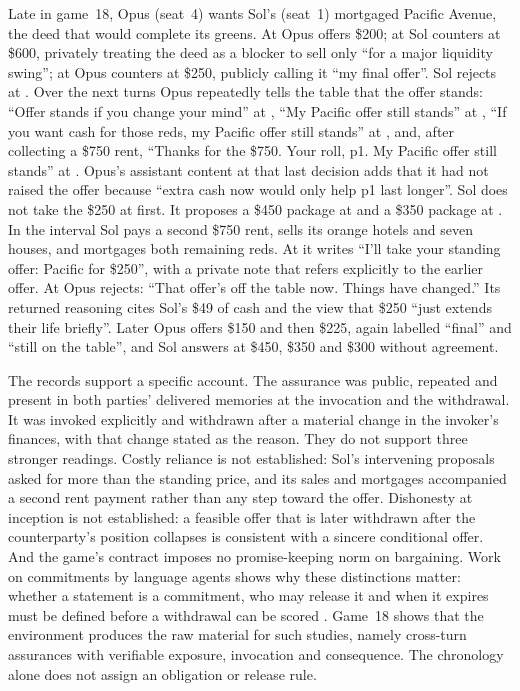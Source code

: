 Late in game~18, Opus (seat~4) wants Sol's (seat~1) mortgaged Pacific Avenue, the deed that would complete its greens. At  Opus offers \$200; at  Sol counters at \$600, privately treating the deed as a blocker to sell only ``for a major liquidity swing''; at  Opus counters at \$250, publicly calling it ``my final offer''. Sol rejects at . Over the next turns Opus repeatedly tells the table that the offer stands: ``Offer stands if you change your mind'' at , ``My Pacific offer still stands'' at , ``If you want cash for those reds, my Pacific offer still stands'' at , and, after collecting a \$750 rent, ``Thanks for the \$750. Your roll, p1. My Pacific offer still stands'' at . Opus's assistant content at that last decision adds that it had not raised the offer because ``extra cash now would only help p1 last longer''. Sol does not take the \$250 at first. It proposes a \$450 package at  and a \$350 package at . In the interval Sol pays a second \$750 rent, sells its orange hotels and seven houses, and mortgages both remaining reds. At  it writes ``I'll take your standing offer: Pacific for \$250'', with a private note that refers explicitly to the earlier offer. At  Opus rejects: ``That offer's off the table now. Things have changed.'' Its returned reasoning cites Sol's \$49 of cash and the view that \$250 ``just extends their life briefly''. Later Opus offers \$150 and then \$225, again labelled ``final'' and ``still on the table'', and Sol answers at \$450, \$350 and \$300 without agreement.

The records support a specific account. The assurance was public, repeated and present in both parties' delivered memories at the invocation and the withdrawal. It was invoked explicitly and withdrawn after a material change in the invoker's finances, with that change stated as the reason. They do not support three stronger readings. Costly reliance is not established: Sol's intervening proposals asked for more than the standing price, and its sales and mortgages accompanied a second rent payment rather than any step toward the offer. Dishonesty at inception is not established: a feasible offer that is later withdrawn after the counterparty's position collapses is consistent with a sincere conditional offer. And the game's contract imposes no promise-keeping norm on bargaining. Work on commitments by language agents shows why these distinctions matter: whether a statement is a commitment, who may release it and when it expires must be defined before a withdrawal can be scored \citep{empty_commitments_v2,commitment_standing,shi2026cheaptalk}. Game~18 shows that the environment produces the raw material for such studies, namely cross-turn assurances with verifiable exposure, invocation and consequence. The chronology alone does not assign an obligation or release rule.

